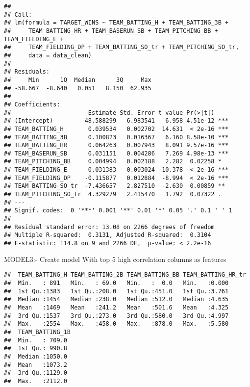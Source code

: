 \documentclass[]{article}
\newenvironment{Shaded}{\begin{snugshade}}{\end{snugshade}}
\newcommand{\KeywordTok}[1]{\textcolor[rgb]{0.13,0.29,0.53}{\textbf{#1}}}
\newcommand{\DataTypeTok}[1]{\textcolor[rgb]{0.13,0.29,0.53}{#1}}
\newcommand{\DecValTok}[1]{\textcolor[rgb]{0.00,0.00,0.81}{#1}}
\newcommand{\StringTok}[1]{\textcolor[rgb]{0.31,0.60,0.02}{#1}}
\newcommand{\OperatorTok}[1]{\textcolor[rgb]{0.81,0.36,0.00}{\textbf{#1}}}
\newcommand{\NormalTok}[1]{#1}
\begin{document}
\begin{verbatim}
## 
## Call:
## lm(formula = TARGET_WINS ~ TEAM_BATTING_H + TEAM_BATTING_3B + 
##     TEAM_BATTING_HR + TEAM_BASERUN_SB + TEAM_PITCHING_BB + TEAM_FIELDING_E + 
##     TEAM_FIELDING_DP + TEAM_BATTING_SO_tr + TEAM_PITCHING_SO_tr, 
##     data = data_clean)
## 
## Residuals:
##     Min      1Q  Median      3Q     Max 
## -58.667  -8.640   0.051   8.150  62.935 
## 
## Coefficients:
##                      Estimate Std. Error t value Pr(>|t|)    
## (Intercept)         48.588299   6.983541   6.958 4.51e-12 ***
## TEAM_BATTING_H       0.039534   0.002702  14.631  < 2e-16 ***
## TEAM_BATTING_3B      0.100823   0.016367   6.160 8.58e-10 ***
## TEAM_BATTING_HR      0.064263   0.007943   8.091 9.57e-16 ***
## TEAM_BASERUN_SB      0.031151   0.004286   7.269 4.98e-13 ***
## TEAM_PITCHING_BB     0.004994   0.002188   2.282  0.02258 *  
## TEAM_FIELDING_E     -0.031383   0.003024 -10.378  < 2e-16 ***
## TEAM_FIELDING_DP    -0.115877   0.012884  -8.994  < 2e-16 ***
## TEAM_BATTING_SO_tr  -7.436657   2.827510  -2.630  0.00859 ** 
## TEAM_PITCHING_SO_tr  4.329279   2.415470   1.792  0.07322 .  
## ---
## Signif. codes:  0 '***' 0.001 '**' 0.01 '*' 0.05 '.' 0.1 ' ' 1
## 
## Residual standard error: 13.08 on 2266 degrees of freedom
## Multiple R-squared:  0.3131, Adjusted R-squared:  0.3104 
## F-statistic: 114.8 on 9 and 2266 DF,  p-value: < 2.2e-16
\end{verbatim}

MODEL3:- Create model With top 5 high correlation columns as features

\begin{Shaded}
\end{Shaded}

\begin{verbatim}
##  TEAM_BATTING_H TEAM_BATTING_2B TEAM_BATTING_BB TEAM_BATTING_HR_tr
##  Min.   : 891   Min.   : 69.0   Min.   :  0.0   Min.   :0.000     
##  1st Qu.:1383   1st Qu.:208.0   1st Qu.:451.0   1st Qu.:3.761     
##  Median :1454   Median :238.0   Median :512.0   Median :4.635     
##  Mean   :1469   Mean   :241.2   Mean   :501.6   Mean   :4.325     
##  3rd Qu.:1537   3rd Qu.:273.0   3rd Qu.:580.0   3rd Qu.:4.997     
##  Max.   :2554   Max.   :458.0   Max.   :878.0   Max.   :5.580     
##  TEAM_BATTING_1B 
##  Min.   : 709.0  
##  1st Qu.: 990.8  
##  Median :1050.0  
##  Mean   :1073.2  
##  3rd Qu.:1129.0  
##  Max.   :2112.0
\end{verbatim}
\end{document}
